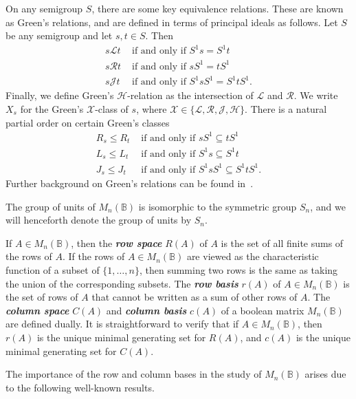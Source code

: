 \documentclass[11pt]{article}
\newcommand{\defn}[1]{\textbf{\textit{#1}}}
\numberwithin{equation}{section}
\newcommand{\B}{\mathbb{B}}
\newcommand{\Bn}{M_n(\B)}
\renewcommand{\L}{\mathscr{L}}
\newcommand{\R}{\mathscr{R}}
\newcommand{\J}{\mathscr{J}}
\renewcommand{\H}{\mathscr{H}}
\begin{document}
On any semigroup $S$, there are some key equivalence relations. These are known
as Green's relations, and are defined in terms of principal ideals as follows.
Let $S$ be any semigroup and let $s, t \in S$. Then
\begin{align*}
  s \L t &\text{ if and only if } S^1 s = S^1 t \\
  s \R t &\text{ if and only if } s S^1 = t S^1 \\
  s \J t &\text{ if and only if } S^1 s S^1 = S^1 t S^1.
\end{align*}
Finally, we define Green's $\H$-relation as the intersection of $\L$ and $\R$.
We write $X_s$ for the Green's $\mathcal{X}$-class of $s$, where
$\mathcal{X} \in \{\L, \R, \J, \H\}$.
There is a natural partial order on certain Green's classes
\begin{align*}
  R_s \leq R_t &\text{ if and only if } sS^1 \subseteq tS^1 \\
  L_s \leq L_t &\text{ if and only if } S^1s \subseteq S^1t \\
  J_s \leq J_t &\text{ if and only if } S^1 s S^1 \subseteq S^1 t S^1.
\end{align*}
Further background on Green's relations can be found in~\cite{Howie1995aa}.


The group of units of $\Bn$ is isomorphic to the symmetric group $S_n$, and we
will henceforth denote the group of units by $S_n$.

If $A \in \Bn$, then the \defn{row space} $R(A)$ of $A$ is the set of 
all finite sums of the rows of $A$.  If the rows of $A\in \Bn$ are viewed as
the characteristic function of a subset of $\{1, \ldots, n\}$, then summing two
rows is the same as taking the union of the corresponding subsets.  The
\defn{row basis} $r(A)$ of $A\in \Bn$ is the set of rows of $A$ that cannot be
written as a sum of other rows of $A$. The \defn{column space}
$C(A)$ and \defn{column basis} $c(A)$ of a boolean matrix $\Bn$ are defined
dually. It is straightforward to verify that if $A \in \Bn$, then $r(A)$ is the
unique minimal generating set for $R(A)$, and $c(A)$ is the unique minimal
generating set for $C(A)$. 


The importance of the row and column bases in the study of $\Bn$ arises due to
the following well-known results.
\end{document}
